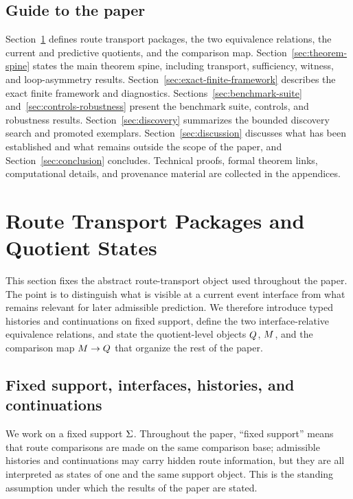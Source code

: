 \documentclass[11pt]{article}
\theoremstyle{definition}
\begin{document}
\subsection{Guide to the paper}\label{subsec:intro-guide}
Section~\ref{sec:route-transport-packages} defines route transport packages, the two equivalence relations, the current and predictive quotients, and the comparison map. Section~\ref{sec:theorem-spine} states the main theorem spine, including transport, sufficiency, witness, and loop-asymmetry results. Section~\ref{sec:exact-finite-framework} describes the exact finite framework and diagnostics. Sections~\ref{sec:benchmark-suite} and~\ref{sec:controls-robustness} present the benchmark suite, controls, and robustness results. Section~\ref{sec:discovery} summarizes the bounded discovery search and promoted exemplars. Section~\ref{sec:discussion} discusses what has been established and what remains outside the scope of the paper, and Section~\ref{sec:conclusion} concludes. Technical proofs, formal theorem links, computational details, and provenance material are collected in the appendices.

\section{Route Transport Packages and Quotient States}\label{sec:route-transport-packages}
This section fixes the abstract route-transport object used throughout the paper. The point is to distinguish what is visible at a current event interface from what remains relevant for later admissible prediction. We therefore introduce typed histories and continuations on fixed support, define the two interface-relative equivalence relations, and state the quotient-level objects $Q$, $M$, and the comparison map $M \to Q$ that organize the rest of the paper.

\subsection{Fixed support, interfaces, histories, and continuations}\label{subsec:rtp-fixed-support}
We work on a fixed support $\Sigma$. Throughout the paper, ``fixed support'' means that route comparisons are made on the same comparison base; admissible histories and continuations may carry hidden route information, but they are all interpreted as states of one and the same support object. This is the standing assumption under which the results of the paper are stated.
\end{document}

